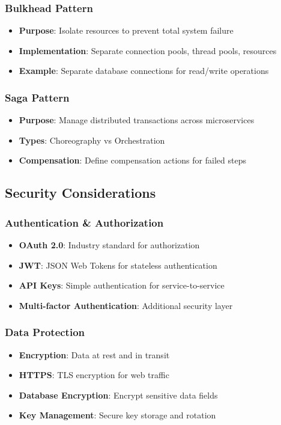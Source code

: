 \documentclass[10pt,a4paper]{article}
\begin{document}
\subsubsection{Bulkhead Pattern}
\begin{itemize}
\item \textbf{Purpose}: Isolate resources to prevent total system failure
\item \textbf{Implementation}: Separate connection pools, thread pools, resources
\item \textbf{Example}: Separate database connections for read/write operations
\end{itemize}

\subsubsection{Saga Pattern}
\begin{itemize}
\item \textbf{Purpose}: Manage distributed transactions across microservices
\item \textbf{Types}: Choreography vs Orchestration
\item \textbf{Compensation}: Define compensation actions for failed steps
\end{itemize}

\subsection{Security Considerations}

\subsubsection{Authentication \& Authorization}
\begin{itemize}
\item \textbf{OAuth 2.0}: Industry standard for authorization
\item \textbf{JWT}: JSON Web Tokens for stateless authentication
\item \textbf{API Keys}: Simple authentication for service-to-service
\item \textbf{Multi-factor Authentication}: Additional security layer
\end{itemize}

\subsubsection{Data Protection}
\begin{itemize}
\item \textbf{Encryption}: Data at rest and in transit
\item \textbf{HTTPS}: TLS encryption for web traffic
\item \textbf{Database Encryption}: Encrypt sensitive data fields
\item \textbf{Key Management}: Secure key storage and rotation
\end{itemize}
\end{document}
